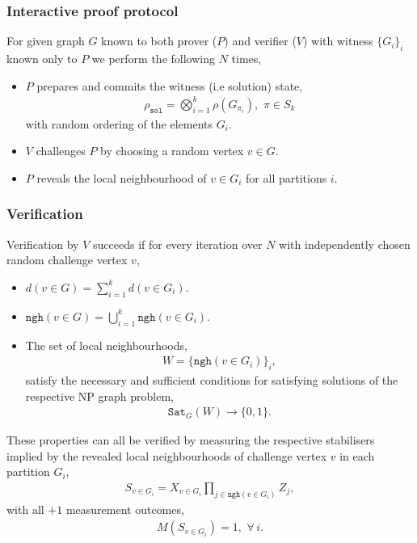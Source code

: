 \documentclass[twocolumn, aps, amsmath, amssymb, nofootinbib, superscriptaddress, longbibliography, doublefloatfix, table-of-contents, eqsecnum, rmp]{revtex4-2}
\begin{document}
\subsubsection{Interactive proof protocol}

For given graph $G$ known to both prover ($P$) and verifier ($V$) with witness $\{G_i\}_i$ known only to $P$ we perform the following $N$ times,
\begin{itemize}
	\item $P$ prepares and commits the witness (i.e solution) state,
	\begin{align}
		\rho_\mathtt{sol} = \bigotimes_{i=1}^k \rho(G_{\pi_i}),\,\,\pi\in S_k
	\end{align}
	with random ordering of the elements $G_i$.
	\item $V$ challenges $P$ by choosing a random vertex $v\in G$.
	\item $P$ reveals the local neighbourhood of $v\in G_i$ for all partitions $i$.
\end{itemize}

\subsubsection{Verification}

Verification by $V$ succeeds if for every iteration over $N$ with independently chosen random challenge vertex $v$,
\begin{itemize}
	\item $d(v\in G) = \sum_{i=1}^k d(v\in G_i)$.
	\item $\texttt{ngh}(v\in G) = \bigcup_{i=1}^k \texttt{ngh}(v\in G_i)$.
	\item The set of local neighbourhoods,
	\begin{align}
		W = \{\texttt{ngh}(v\in G_i)\}_i,
	\end{align}
	satisfy the necessary and sufficient conditions for satisfying solutions of the respective NP graph problem,
	\begin{align}
		\texttt{Sat}_G(W) \to \{0,1\}.
	\end{align}
\end{itemize}
These properties can all be verified by measuring the respective stabilisers implied by the revealed local neighbourhoods of challenge vertex $v$ in each partition $G_i$,
\begin{align}
	S_{v\in G_i} = X_{v\in G_i} \prod_{j\in\texttt{ngh}(v\in G_i)} Z_j,
\end{align}
with all $+1$ measurement outcomes,
\begin{align}
	M(S_{v\in G_i}) = 1,\,\,\forall\,i.	
\end{align}
\end{document}
